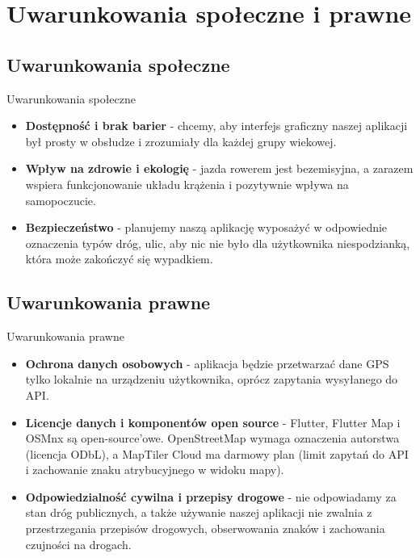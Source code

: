 \documentclass[10pt]{beamer}
\begin{document}
\section{Uwarunkowania społeczne i prawne}

\subsection*{Uwarunkowania społeczne}

\begin{frame}{Uwarunkowania społeczne}
	\begin{itemize}
		\item \textbf{Dostępność i brak barier} - chcemy, aby interfejs graficzny naszej aplikacji był prosty w obsłudze i zrozumiały dla każdej grupy wiekowej.
		\vspace{0.7cm}
		\item \textbf{Wpływ na zdrowie i ekologię} - jazda rowerem jest bezemisyjna, a zarazem wspiera funkcjonowanie układu krążenia i pozytywnie wpływa na samopoczucie.
		\vspace{0.7cm}
		\item\textbf{ Bezpieczeństwo }- planujemy naszą aplikację wyposażyć w odpowiednie oznaczenia typów dróg, ulic, aby nic nie było dla użytkownika niespodzianką, która może zakończyć się wypadkiem.
		
	\end{itemize}
\end{frame}

\subsection*{Uwarunkowania prawne}

\begin{frame}{Uwarunkowania prawne}
	\begin{itemize}
		\item \textbf{Ochrona danych osobowych} - aplikacja będzie przetwarzać dane GPS tylko lokalnie na urządzeniu użytkownika, oprócz zapytania wysyłanego do API.
		\vspace{0.7cm}
		\item \textbf{Licencje danych i komponentów open source} - Flutter, Flutter Map i OSMnx są open-source'owe. OpenStreetMap wymaga oznaczenia autorstwa (licencja ODbL), a MapTiler Cloud ma darmowy plan (limit zapytań do API i zachowanie znaku atrybucyjnego w widoku mapy).
		\vspace{0.7cm}
		\item \textbf{Odpowiedzialność cywilna i przepisy drogowe} - nie odpowiadamy za stan dróg publicznych, a także używanie naszej aplikacji nie zwalnia z przestrzegania przepisów drogowych, obserwowania znaków i zachowania czujności na drogach.
		
	\end{itemize}
\end{frame}
\end{document}
